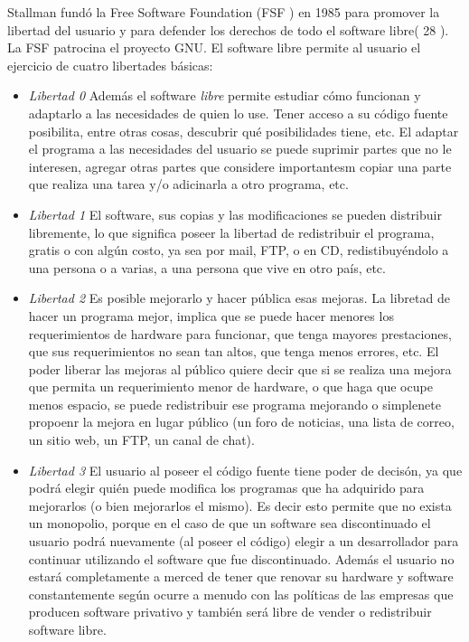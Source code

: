 Stallman fundó la Free Software Foundation (FSF ) en 1985 para promover la libertad del usuario y para defender los derechos de todo el software libre( 28 ). La FSF patrocina el proyecto GNU. El software libre permite al usuario el ejercicio de cuatro libertades básicas:

\begin {itemize}
\item
 \textit{Libertad 0} Además el software \textit{libre} permite estudiar cómo funcionan y adaptarlo a las necesidades de quien lo use. Tener acceso a su código fuente posibilita, entre otras cosas, descubrir qué posibilidades tiene, etc. El adaptar el programa a las necesidades del usuario se puede suprimir partes que no le interesen, agregar otras partes que considere importantesm copiar una parte que realiza una tarea y/o adicinarla a otro programa, etc.

\item
\textit{Libertad 1} El software, sus copias y las modificaciones se pueden distribuir libremente, lo que significa poseer la libertad de redistribuir el programa, gratis o con algún costo, ya sea por mail, FTP, o en CD, redistibuyéndolo a una persona o a varias, a una persona que vive en otro país, etc.

\item 
\textit{Libertad 2} Es posible mejorarlo y hacer pública esas mejoras. La libretad de hacer un programa mejor, implica que se puede hacer menores los requerimientos de hardware para funcionar, que tenga mayores prestaciones, que sus requerimientos no sean tan altos, que tenga menos errores, etc. El poder liberar las mejoras al público quiere decir que si se realiza una mejora que permita un requerimiento menor de hardware, o que haga que ocupe menos espacio, se puede redistribuir ese programa mejorando o simplenete propoenr la mejora en lugar público (un foro de noticias, una lista de correo, un sitio web, un FTP, un canal de chat).

\item 
\textit{Libertad 3} El usuario al poseer el código fuente tiene poder de decisón, ya que podrá elegir quién puede modifica los programas que ha adquirido para mejorarlos (o bien mejorarlos el mismo). Es decir esto permite que no exista un monopolio, porque en el caso de que un software sea discontinuado el usuario podrá nuevamente (al poseer el código) elegir a un desarrollador para continuar utilizando el software que fue discontinuado. Además el usuario no estará completamente a merced de tener que renovar su hardware y software constantemente según ocurre a menudo con las políticas de las empresas que producen software privativo y también será libre de vender o redistribuir software libre.
 
 \end {itemize}
 
